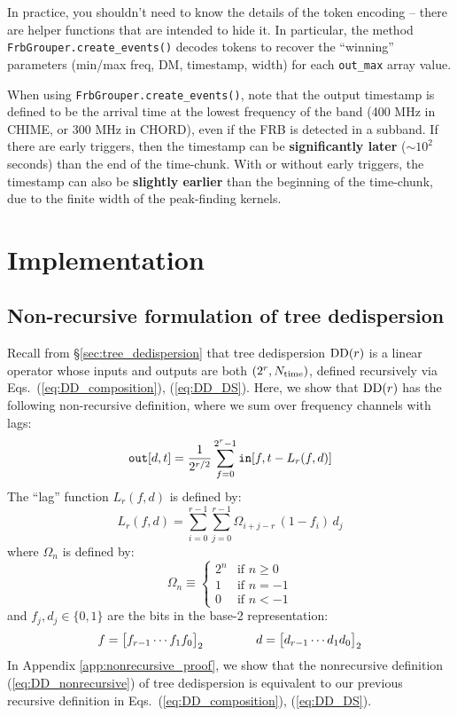 \documentclass{article}
\numberwithin{equation}{section}   %
\def\DD{{\rm DD}}
\begin{document}
In practice, you shouldn't need to know the details of the token encoding -- there are helper
functions that are intended to hide it. In particular, the method \verb|FrbGrouper.create_events()| 
decodes tokens to recover the ``winning'' parameters (min/max freq, DM, timestamp, width) 
for each \verb|out_max| array value.

When using \verb|FrbGrouper.create_events()|, note that the output timestamp is defined to 
be the arrival time at the lowest frequency of the band (400 MHz in CHIME, or 300 MHz 
in CHORD), even if the FRB is detected in a subband.
If there are early triggers, then the timestamp can be {\bf significantly later}
($\sim 10^2$ seconds) than the end of the time-chunk.
With or without early triggers, the timestamp can also be {\bf slightly earlier}
than the beginning of the time-chunk, due to the finite width of the peak-finding
kernels.

\clearpage

\section{Implementation}

\subsection{Non-recursive formulation of tree dedispersion}

Recall from \S\ref{sec:tree_dedispersion} that tree dedispersion $\DD(r)$ is a linear operator
whose inputs and outputs are both $(2^r,N_{\rm time})$, defined recursively via
Eqs.\ (\ref{eq:DD_composition}), (\ref{eq:DD_DS}).
Here, we show that $\DD(r)$ has the following non-recursive definition, where
we sum over frequency channels with lags:
\begin{equation}
{\tt out}[d,t] = \frac{1}{2^{r/2}} \sum_{f=0}^{2^r-1} {\tt in}[f,t - L_r(f,d)]  \label{eq:DD_nonrecursive}
\end{equation}
The ``lag'' function $L_r(f,d)$ is defined by:
\begin{equation}
L_r(f,d) = \sum_{i=0}^{r-1} \sum_{j=0}^{r-1} \Omega_{i+j-r} \, (1-f_i) \, d_j  \label{eq:L_def}
\end{equation}
where $\Omega_n$ is defined by:
\begin{equation}
\Omega_n \equiv \begin{cases}
 2^n & \mbox{if } n \ge 0 \\
  1 & \mbox{if } n = -1 \\
  0 & \mbox{if } n < -1
\end{cases}
\end{equation}
and $f_j,d_j \in \{0,1\}$ are the bits in the base-2 representation:
\begin{equation}
f = \big[ f_{r-1} \cdots f_1 f_0 \big]_2
  \hspace{1.5cm}
d = \big[ d_{r-1} \cdots d_1 d_0 \big]_2
\end{equation}
In Appendix \ref{app:nonrecursive_proof}, we show that the nonrecursive definition 
(\ref{eq:DD_nonrecursive}) of tree dedispersion is equivalent to our previous
recursive definition in Eqs.\ (\ref{eq:DD_composition}), (\ref{eq:DD_DS}).
\end{document}
